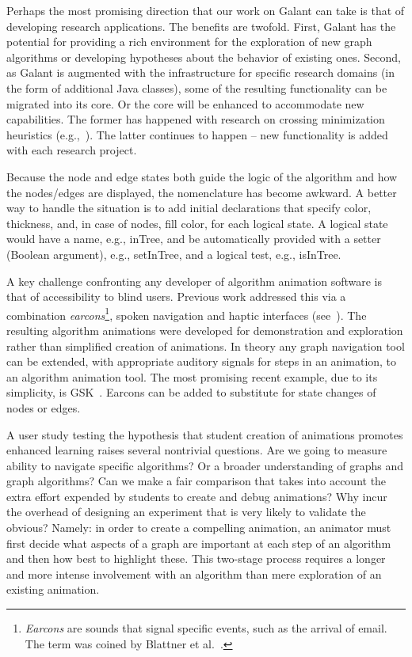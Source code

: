 Perhaps the most promising direction that our work on Galant can take is that
of developing research applications.  The benefits are twofold.  First,
Galant has the potential for providing a rich environment for the exploration
of new graph algorithms or developing hypotheses about the behavior of
existing ones.  Second, as Galant is augmented with the infrastructure for
specific research domains (in the form of additional Java classes), some of the
resulting functionality can be migrated into its core. Or the core
will be enhanced to accommodate new capabilities. The former
has happened with research on crossing
minimization heuristics (e.g.,~\cite{2012-JEA-Stallmann}).
The latter continues to happen -- new functionality is added with each
research project.

  Because the node and edge states both guide the logic of the algorithm
  and how the nodes/edges are displayed, the nomenclature has become awkward.
  A better way to handle the situation is to add initial declarations
  that specify color, thickness, and, in case of nodes, fill color, for each logical state.
  A logical state would have a name, e.g., \textsf{inTree},
  and be automatically provided with a setter (Boolean argument),
  e.g., \textsf{setInTree}, and a logical test, e.g., \textsf{isInTree}.

A key challenge confronting any developer of algorithm animation
software is that of accessibility to blind users.
Previous work addressed this via a combination \emph{earcons}\footnote{
\emph{Earcons} are sounds that signal specific events, such as the arrival of email. The term was coined by Blattner et al.~\cite{1989-HCI-Blattner-earcons}.
}, spoken navigation
and haptic interfaces
(see~\cite{2002-SoftViz-Baloian,2005-SCCC-Baloian,2002-Diagrams-Bennett}).
The resulting algorithm animations were developed for demonstration and exploration rather than simplified
creation of
animations.
In theory any graph navigation tool can be extended, with appropriate auditory
signals for steps in an animation, to an algorithm animation tool.
The most promising recent example, due to its simplicity, is GSK~\cite{2013-SIGCSE-Balik}.
Earcons can be added to substitute for state changes of nodes or edges.

A user study testing the hypothesis that student creation of animations
promotes enhanced learning raises several nontrivial questions.
Are we going to measure ability to navigate specific algorithms? Or a broader
understanding of graphs and graph algorithms?
Can we make a fair comparison that takes into account the
extra effort expended by students to create and debug animations?
Why incur the overhead of designing an experiment that is very likely to validate the obvious?
Namely:
in order to create a compelling animation,
an animator must first decide what aspects of a graph are important
at each step of an algorithm and then how best to highlight these.
This two-stage process requires a longer and more intense involvement
with an algorithm than mere exploration of an existing animation.

